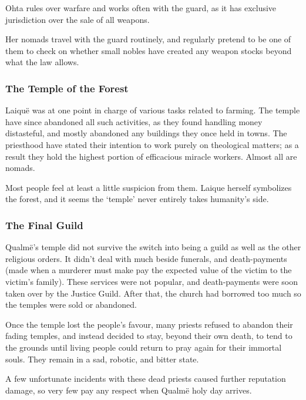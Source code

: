\begin{multicols}{2}
Ohta rules over warfare and works often with the \gls{guard}, as it has exclusive jurisdiction over the sale of all weapons.

Her \glspl{nomad} travel with the \gls{guard} routinely, and regularly pretend to be one of them to check on whether small nobles have created any weapon stocks beyond what the law allows.


\subsubsection{The Temple of the Forest}

Laiqu\"{e} was at one point in charge of various tasks related to farming.
The temple have since abandoned all such activities, as they found handling money distasteful, and mostly abandoned any buildings they once held in towns.
The priesthood have stated their intention to work purely on theological matters; as a result they hold the highest portion of efficacious miracle workers.
Almost all are \glspl{nomad}.

Most people feel at least a little suspicion from them.
Laique herself symbolizes the forest, and it seems the `temple' never entirely takes humanity's side.

\subsubsection{The Final Guild}

Qualm\"{e}'s temple did not survive the switch into being a guild as well as the other religious orders.
It didn't deal with much beside funerals, and death-payments (made when a murderer must make pay the expected value of the victim to the victim's family).
These services were not popular, and death-payments were soon taken over by the Justice Guild.
After that, the church had borrowed too much so the temples were sold or abandoned.

Once the temple lost the people's favour, many priests refused to abandon their fading temples, and instead decided to stay, beyond their own death, to tend to the grounds until living people could return to pray again for their immortal souls.
They remain in a sad, robotic, and bitter state.

A few unfortunate incidents with these dead priests caused further reputation damage, so very few pay any respect when Qualm\"e holy day arrives.


\end{multicols}
